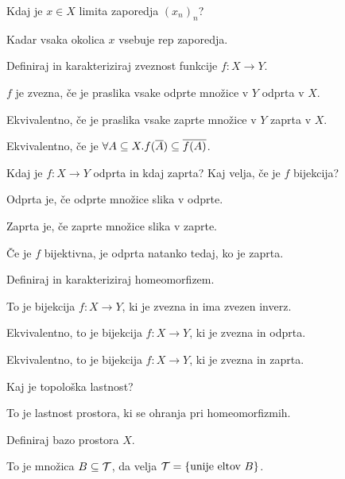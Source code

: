 \begin{vo}{Kdaj je $x \in X$ limita zaporedja $(x_n)_n$?}

Kadar vsaka okolica $x$ vsebuje rep zaporedja.

\end{vo}

\begin{vo}{Definiraj in karakteriziraj zveznost funkcije $f:X \to Y$.}

$f$ je zvezna, če je praslika vsake odprte množice v $Y$ odprta v $X$.

Ekvivalentno, če je praslika vsake zaprte množice v $Y$ zaprta v $X$.

Ekvivalentno, če je $\forall A \subseteq X . f(\overline{A}) \subseteq \overline{f(A)}$.

\end{vo}

\begin{vo}{Kdaj je $f: X \to Y$ odprta in kdaj zaprta? Kaj velja, če je
  $f$ bijekcija?}

Odprta je, če odprte množice slika v odprte.

Zaprta je, če zaprte množice slika v zaprte.

Če je $f$ bijektivna, je odprta natanko tedaj, ko je zaprta.

\end{vo}

\begin{vo}{Definiraj in karakteriziraj homeomorfizem.}

To je bijekcija $f:X \to Y$, ki je zvezna in ima zvezen inverz.

Ekvivalentno, to je bijekcija $f: X \to Y$, ki je zvezna in odprta.

Ekvivalentno, to je bijekcija $f: X \to Y$, ki je zvezna in zaprta.

\end{vo}

\begin{vo}{Kaj je topološka lastnost?}

To je lastnost prostora, ki se ohranja pri homeomorfizmih.

\end{vo}

\begin{vo}{Definiraj bazo prostora $X$.}

To je množica $B \subseteq \mathcal{T}$, da velja $\mathcal{T} = \{ \text{unije eltov $B$} \}$.

\end{vo}

